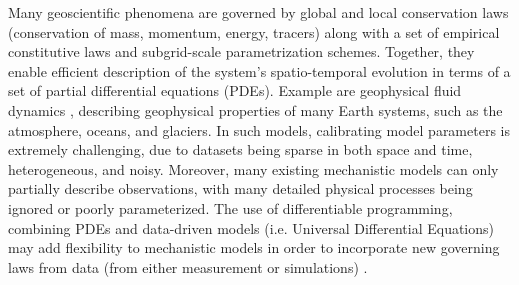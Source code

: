 Many geoscientific phenomena are governed by global and local conservation laws (conservation of mass, momentum, energy, tracers) along with a set of empirical constitutive laws and subgrid-scale parametrization schemes. 
Together, they enable efficient description of the system's spatio-temporal evolution in terms of a set of partial differential equations (PDEs).
Example are geophysical fluid dynamics \cite{Vallis:2016kv}, describing geophysical properties of many Earth systems, such as the atmosphere, oceans, and glaciers.
In such models, calibrating model parameters is extremely challenging, due to datasets being sparse in both space and time, heterogeneous, and noisy.
Moreover, many existing mechanistic models can only partially describe observations, with many detailed physical processes being ignored or poorly parameterized. 
The use of differentiable programming, combining PDEs and data-driven models (i.e. Universal Differential Equations) may add flexibility to mechanistic models in order to incorporate new governing laws from data (from either measurement or simulations) \cite{rackauckas2020universal}.

